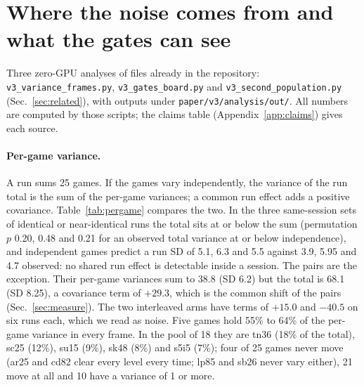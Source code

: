 \section{Where the noise comes from and what the gates can see}\label{app:noisegates}

Three zero-GPU analyses of files already in the repository: \texttt{v3\_variance\_frames.py}, \texttt{v3\_gates\_board.py} and \texttt{v3\_second\_population.py} (Sec.~\ref{sec:related}), with outputs under \texttt{paper/v3/analysis/out/}.
All numbers are computed by those scripts; the claims table (Appendix~\ref{app:claims}) gives each source.

\paragraph{Per-game variance.}
A run sums 25 games. If the games vary independently, the variance of the run total is the sum of the per-game variances; a common run effect adds a positive covariance. Table~\ref{tab:pergame} compares the two.
In the three same-session sets of identical or near-identical runs the total sits at or below the sum (permutation $p$ 0.20, 0.48 and 0.21 for an observed total variance at or below independence), and independent games predict a run SD of 5.1, 6.3 and 5.5 against 3.9, 5.95 and 4.7 observed: no shared run effect is detectable inside a session. %
The pairs are the exception. Their per-game variances sum to 38.8 (SD 6.2) but the total is 68.1 (SD 8.25), a covariance term of $+29.3$, which is the common shift of the pairs (Sec.~\ref{sec:measure}). The two interleaved arms have terms of $+15.0$ and $-40.5$ on six runs each, which we read as noise. %
Five games hold 55\% to 64\% of the per-game variance in every frame. In the pool of 18 they are tn36 (18\% of the total), sc25 (12\%), su15 (9\%), sk48 (8\%) and s5i5 (7\%); four of 25 games never move (ar25 and cd82 clear every level every time; lp85 and sb26 never vary either), 21 move at all and 10 have a variance of 1 or more. %

